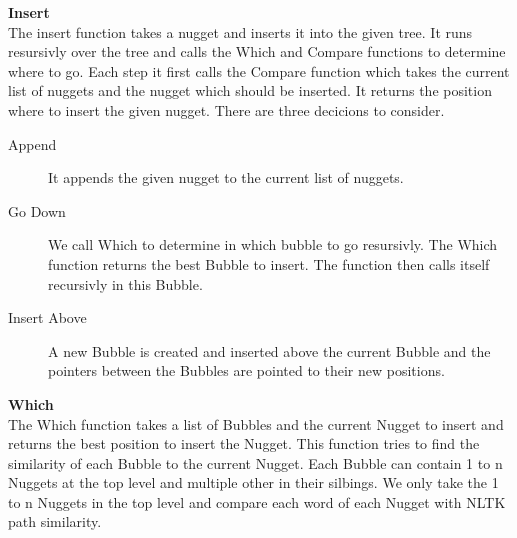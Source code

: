 \textbf{Insert}\\


The insert function takes a nugget and inserts it into the given tree. It runs resursivly over the tree and calls the Which and Compare functions to determine where to go. Each step it first calls the Compare function which takes the current list of nuggets and the nugget which should be inserted. It returns the position where to insert the given nugget. There are three decicions to consider.

\begin{description}
\item [Append] It appends the given nugget to the current list of nuggets.
\item [Go Down] We call Which to determine in which bubble to go resursivly. The Which function returns the best Bubble to insert. The function then calls itself recursivly in this Bubble.
\item [Insert Above] A new Bubble is created and inserted above the current Bubble and the pointers between the Bubbles are pointed to their new positions.
\end{description}

\textbf{Which}\\

The Which function takes a list of Bubbles and the current Nugget to insert and returns the best position to insert the Nugget. This function tries to find the similarity of each Bubble to the current Nugget. Each Bubble can contain 1 to n Nuggets at the top level and multiple other in their silbings. We only take the 1 to n Nuggets in the top level and compare each word of each Nugget with NLTK path similarity.


